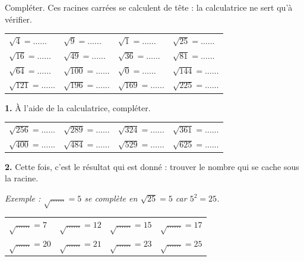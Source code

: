 \documentclass[11pt]{article}
\begin{document}

\begin{center}
\end{center}

\begin{exercicedevoir}
Compléter. Ces racines carrées se calculent de tête : la calculatrice
ne sert qu'à vérifier.

\renewcommand{\arraystretch}{1.5}
{\centering
\begin{tabular}{llll}
$\sqrt{4} = \ldots\ldots$ & $\sqrt{9} = \ldots\ldots$ & $\sqrt{1} = \ldots\ldots$ & $\sqrt{25} = \ldots\ldots$ \\
$\sqrt{16} = \ldots\ldots$ & $\sqrt{49} = \ldots\ldots$ & $\sqrt{36} = \ldots\ldots$ & $\sqrt{81} = \ldots\ldots$ \\
$\sqrt{64} = \ldots\ldots$ & $\sqrt{100} = \ldots\ldots$ & $\sqrt{0} = \ldots\ldots$ & $\sqrt{144} = \ldots\ldots$ \\
$\sqrt{121} = \ldots\ldots$ & $\sqrt{196} = \ldots\ldots$ & $\sqrt{169} = \ldots\ldots$ & $\sqrt{225} = \ldots\ldots$ \\
\end{tabular}\par}
\end{exercicedevoir}

\begin{exercicedevoir}
\textbf{1.} À l'aide de la calculatrice, compléter.

\renewcommand{\arraystretch}{1.5}
{\centering
\begin{tabular}{llll}
$\sqrt{256} = \ldots\ldots$ & $\sqrt{289} = \ldots\ldots$ & $\sqrt{324} = \ldots\ldots$ & $\sqrt{361} = \ldots\ldots$ \\
$\sqrt{400} = \ldots\ldots$ & $\sqrt{484} = \ldots\ldots$ & $\sqrt{529} = \ldots\ldots$ & $\sqrt{625} = \ldots\ldots$ \\
\end{tabular}\par}

\medskip
\textbf{2.} Cette fois, c'est le résultat qui est donné : trouver le
nombre qui se cache sous la racine.

\textit{Exemple : $\sqrt{\ldots\ldots} = 5$ \quad se complète en \quad
  $\sqrt{25} = 5$ \quad car $5^2 = 25$.}

{\centering
\begin{tabular}{llll}
$\sqrt{\ldots\ldots} = 7$ & $\sqrt{\ldots\ldots} = 12$ & $\sqrt{\ldots\ldots} = 15$ & $\sqrt{\ldots\ldots} = 17$ \\
$\sqrt{\ldots\ldots} = 20$ & $\sqrt{\ldots\ldots} = 21$ & $\sqrt{\ldots\ldots} = 23$ & $\sqrt{\ldots\ldots} = 25$ \\
\end{tabular}\par}
\end{exercicedevoir}
\end{document}
